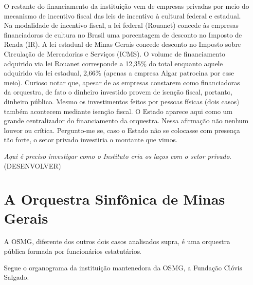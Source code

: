 \documentclass[a4paper, 12pt, openright, oneside, german, french, english, brazil]{abntex2}
\begin{document}
	O restante do financiamento da instituição vem de empresas privadas por meio do mecanismo de incentivo fiscal das leis de incentivo à cultural federal e estadual. Na modalidade de incentivo fiscal, a lei federal (Rouanet) concede às empresas financiadoras de cultura no Brasil uma porcentagem de desconto no Imposto de Renda (IR). A lei estadual de Minas Gerais concede desconto no Imposto sobre Circulação de Mercadorias e Serviços (ICMS). O volume de financiamento adquirido via lei Rouanet corresponde a 12,35\% do total enquanto aquele adquirido via lei estadual, 2,66\% (apenas a empresa Algar patrocina por esse meio). Curioso notar que, apesar de as empresas constarem como financiadoras da orquestra, de fato o dinheiro investido provem de isenção fiscal, portanto, dinheiro público. Mesmo os investimentos feitos por pessoas físicas (dois casos) também acontecem mediante isenção fiscal. O Estado aparece aqui como um grande centralizador do financiamento da orquestra. Nessa afirmação não nenhum louvor ou crítica. Pergunto-me se, caso o Estado não se colocasse com presença tão forte, o setor privado investiria o montante que vimos.
	
	\textit{Aqui é preciso investigar como o Instituto cria os laços com o setor privado.} (DESENVOLVER) 
	
	
	
	\section{A Orquestra Sinfônica de Minas Gerais}
	
	A OSMG, diferente dos outros dois casos analisados supra, é uma orquestra pública formada por funcionários estatutários.
	
	Segue o organograma da instituição mantenedora da OSMG, a Fundação Clóvis Salgado.
	
\end{document}
